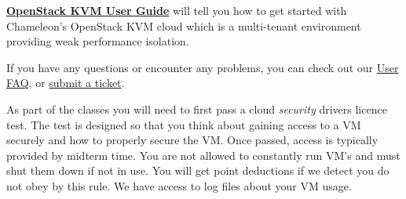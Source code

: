 \textbf{\href{https://www.chameleoncloud.org/docs/user-guides/openstack-kvm-user-guide/}{OpenStack
KVM User Guide}} will tell you how to get started with Chameleon's
OpenStack KVM cloud which is a multi-tenant environment providing weak
performance isolation. 

If you have any questions or encounter any problems, you can check out
our \href{https://www.chameleoncloud.org/docs/user-faq/}{User FAQ},
or \href{https://www.chameleoncloud.org/user/help/}{submit a ticket}.

\begin{IU}
As part of the classes you will need to first pass a cloud \textit{security}
drivers licence test.  The test is designed so that you think about
gaining access to a VM securely and how to properly secure the
VM. Once passed, access is typically provided by midterm time. You are
not allowed to constantly run VM's and must shut them down if not in
use. You will get point deductions if we detect you do not obey by
this rule. We have access to log files about your VM usage.
\end{IU}

